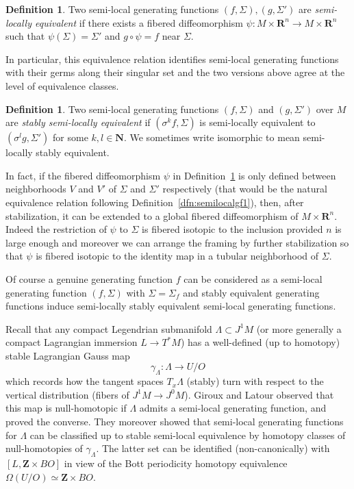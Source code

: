 \documentclass[12pt,a4paper]{article}
\numberwithin{equation}{section}
\theoremstyle{definition}
\newtheorem{dfn}[equation]{Definition}
\theoremstyle{remark}
\newcommand{\Z}{\mathbf{Z}}
\newcommand{\R}{\mathbf{R}}
\newcommand{\N}{\mathbf{N}}
\begin{document}
\begin{dfn}\label{dfn:semilocalequiv}
Two semi-local generating functions $(f,\Sigma),(g,\Sigma')$ are \emph{semi-locally equivalent} if there exists
a fibered diffeomorphism $\psi:M\times \R^n\to M\times \R^n$ such that $\psi(\Sigma)=\Sigma'$
and $g\circ \psi=f$ near $\Sigma$.
\end{dfn}

In particular, this equivalence relation identifies semi-local generating functions with their germs
along their singular set and the two versions above agree at the level of equivalence classes.

\begin{dfn}\label{dfn:stable_sl_equiv}
Two semi-local generating functions $(f,\Sigma)$ and $(g,\Sigma')$ over $M$ are \emph{stably semi-locally equivalent}
if $(\sigma^k f,\Sigma)$ is semi-locally equivalent to $(\sigma^l g,\Sigma')$ for some $k,l \in \N$. We sometimes write
isomorphic to mean semi-locally stably equivalent.
\end{dfn}

In fact, if the fibered diffeomorphism $\psi$ in Definition~\ref{dfn:semilocalequiv} is only defined between neighborhoods
$V$ and $V'$ of $\Sigma$ and $\Sigma'$ respectively (that would be the natural equivalence relation following Definition~\ref{dfn:semilocalgf1}),
then, after stabilization, it can be extended to a global fibered diffeomorphism of $M\times \R^n$.
Indeed the restriction of $\psi$ to $\Sigma$ is fibered isotopic to the inclusion provided $n$ is large enough
and moreover we can arrange the framing by further stabilization so that $\psi$ is fibered isotopic
to the identity map in a tubular neighborhood of $\Sigma$.

Of course a genuine generating function $f$ can be considered as a semi-local generating function $(f,\Sigma)$ with $\Sigma=\Sigma_f$
and stably equivalent generating functions induce semi-locally stably equivalent semi-local generating functions.

Recall that any compact Legendrian submanifold $\Lambda \subset J^1 M$ (or more generally a compact Lagrangian immersion
$L\to T^*M$) has a well-defined (up to homotopy)
stable Lagrangian Gauss map
\[\gamma_\Lambda : \Lambda \to U/O\]
which records how the tangent spaces $T_x \Lambda$ (stably) turn with respect to the vertical distribution (fibers of $J^1 M \to J^0 M$).
Giroux and Latour observed that this map is null-homotopic if $\Lambda$ admits a semi-local generating function,
and proved the converse. They moreover showed that semi-local generating functions for $\Lambda$ can be classified up to stable semi-local equivalence
by homotopy classes of null-homotopies of $\gamma_\Lambda$. The latter set can be identified (non-canonically) with
$[L,\Z\times BO]$ in view of the Bott periodicity homotopy equivalence $\Omega (U/O) \simeq \Z\times BO$.
\end{document}
